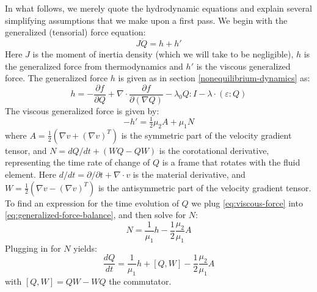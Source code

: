 \documentclass[reqno]{article}
\begin{document}
  In what follows, we merely quote the hydrodynamic equations and explain
  several simplifying assumptions that we make upon a first pass.
  We begin with the generalized (tensorial) force equation:
  \begin{equation} \label{eq:generalized-force-balance}
    J \ddot{Q} = h + h'
  \end{equation}
  Here $J$ is the moment of inertia density (which we will take to be
  negligible), $h$ is the generalized force from thermodynamics and $h'$ is the
  viscous generalized force.
  The generalized force $h$ is given as in section
  \ref{nonequilibrium-dynamics} as:
  \begin{equation}
    h
    =
    -\frac{\partial f}{\partial Q}
    + \nabla \cdot \frac{\partial f}{\partial (\nabla Q)}
    - \lambda_0 Q : I
    - \lambda \cdot \left( \varepsilon : Q \right)
  \end{equation}
  The viscous generalized force is given by:
  \begin{equation} \label{eq:viscous-force}
    -h'
    =
    \tfrac12 \mu_2 A
    + \mu_1 N
  \end{equation}
  where $A = \tfrac12 \left( \nabla v + \left( \nabla v \right)^T \right)$ is
  the symmetric part of the velocity gradient tensor, and $N = dQ / dt + (WQ -
  QW)$ is the corotational derivative, representing the time rate of change of
  $Q$ is a frame that rotates with the fluid element.
  Here $d/dt = \partial / \partial t + \nabla \cdot v$ is the material
  derivative, and $W = \tfrac12 \left( \nabla v - \left( \nabla v \right)^T
  \right)$ is the antisymmetric part of the velocity gradient tensor.
  To find an expression for the time evolution of $Q$ we plug
  \eqref{eq:viscous-force} into \eqref{eq:generalized-force-balance}, and then
  solve for $N$:
  \begin{equation} \label{eq:N}
    N = \frac{1}{\mu_1} h - \frac12 \frac{\mu_2}{\mu_1} A
  \end{equation}
  Plugging in for $N$ yields:
  \begin{equation} \label{eq:Q-equation}
    \frac{d Q}{dt}
    =
    \frac{1}{\mu_1} h
    + \left[ Q, W \right]
    - \frac12 \frac{\mu_2}{\mu_1} A
  \end{equation}
  with $\left[ Q, W \right] = QW - WQ$ the commutator.
\end{document}
